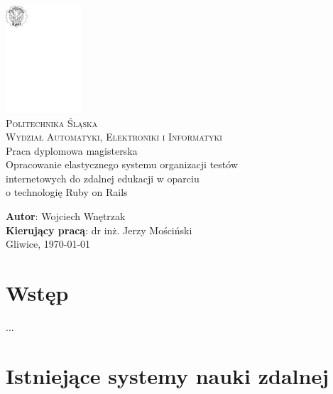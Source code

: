 \documentclass[12pt,twoside]{report}
\begin{document}
\pagestyle{fancy}
\lhead{\nouppercase{\rightmark}}
\rhead{\nouppercase{\leftmark}}
\renewcommand{\chaptermark}[1]{\markboth{\chaptername \ \thechapter. \ #1}{}}
\renewcommand{\sectionmark}[1]{\markright{#1}{}}
\fancyhead{}
\fancyfoot{}
\fancyhead[LO]{\rightmark}
\fancyhead[RE]{\leftmark}
\fancyhead[LE]{\thepage}
\fancyhead[RO]{\thepage}

\begin{titlepage}
  \begin{center}
    \includegraphics[width=80pt]{images/godlo.pdf}\\[30pt]
    \Large\textsc{Politechnika Śląska}\\[0.5em]
    \textsc{Wydział Automatyki, Elektroniki i Informatyki}\\[100pt]
    \LARGE Praca dyplomowa magisterska\\[50pt]
    Opracowanie elastycznego systemu organizacji testów\\[0.5em]
    internetowych do zdalnej edukacji w oparciu\\[0.5em]
    o technologię Ruby on Rails\\[80pt]
  \end{center}
  \Large\textbf{Autor}: Wojciech Wnętrzak\\
  \Large\textbf{Kierujący pracą}: dr inż. Jerzy Mościński\\
  \vfill
  \normalsize\centering Gliwice, \today
\end{titlepage}

\tableofcontents

\cleardoublepage
\chapter{Wstęp}
...

\chapter{Istniejące systemy nauki zdalnej}
\end{document}
